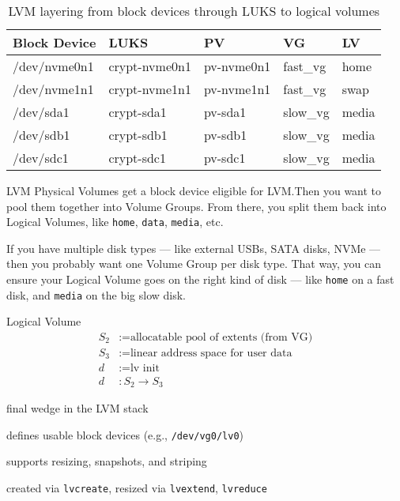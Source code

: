 \documentclass[openany, 12pt]{book}
\begin{document}
\begin{table}[h]
	\centering
	\begin{tabular}{lllll}
		\toprule
		\textbf{Block Device} & \textbf{LUKS} & \textbf{PV} & \textbf{VG} & \textbf{LV} \\
		\midrule
		/dev/nvme0n1          & crypt-nvme0n1 & pv-nvme0n1  & fast\_vg    & home        \\
		/dev/nvme1n1          & crypt-nvme1n1 & pv-nvme1n1  & fast\_vg    & swap        \\
		/dev/sda1             & crypt-sda1    & pv-sda1     & slow\_vg    & media       \\
		/dev/sdb1             & crypt-sdb1    & pv-sdb1     & slow\_vg    & media       \\
		/dev/sdc1             & crypt-sdc1    & pv-sdc1     & slow\_vg    & media       \\
		\bottomrule
	\end{tabular}
	\caption{LVM layering from block devices through LUKS to logical volumes}
\end{table}

\begin{intuition}{LVM}{}
	Physical Volumes get a block device eligible for LVM.\@ Then you want to
	pool them together into Volume Groups. From there, you split them back into
	Logical Volumes, like \texttt{home}, \texttt{data}, \texttt{media}, etc.

	If you have multiple disk types — like external USBs, SATA disks, NVMe — then
	you probably want one Volume Group per disk type. That way, you can ensure
	your Logical Volume goes on the right kind of disk — like \texttt{home} on a
	fast disk, and \texttt{media} on the big slow disk.
\end{intuition}

\begin{definition}{Logical Volume}{}
	\begin{align*}
		S_2 & := \text{allocatable pool of extents (from VG)} \\
		S_3 & := \text{linear address space for user data}    \\
		d   & := \text{lv init}                               \\
		d   & : S_2 \to S_3
	\end{align*}
	\begin{alist}
		\item final wedge in the LVM stack
		\item defines usable block devices (e.g., \texttt{/dev/vg0/lv0})
		\item supports resizing, snapshots, and striping
		\item created via \texttt{lvcreate}, resized via \texttt{lvextend}, \texttt{lvreduce}
	\end{alist}
\end{definition}
\end{document}
